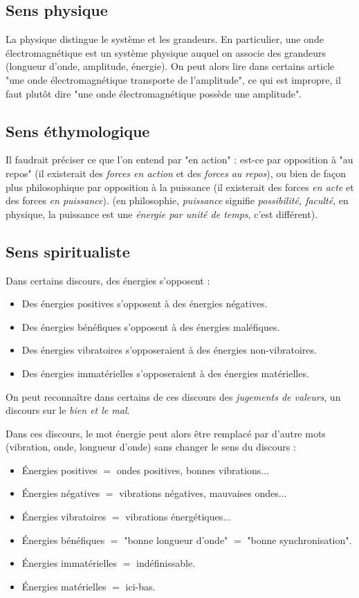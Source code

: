 \subsection{Sens physique}
La physique distingue le système et les grandeurs. En particulier, une onde électromagnétique est un système physique auquel on associe des grandeurs (longueur d'onde, amplitude, énergie). On peut alors lire dans certains article "une onde électromagnétique transporte de l'amplitude", ce qui est impropre, il faut plutôt dire "une onde électromagnétique possède une amplitude".

\subsection{Sens éthymologique}
Il faudrait préciser ce que l'on entend par "en action" : est-ce par opposition à "au repos" (il existerait des {\it forces en action} et des {\it forces au repos}), ou bien de façon plus philosophique par opposition à la puissance (il existerait des forces {\it en acte} et des forces {\it en puissance}). (en philosophie, {\it puissance} signifie {\it possibilité, faculté}, en physique, la puissance est une {\it énergie par unité de temps}, c'est différent).

\subsection{Sens spiritualiste}
Dans certains discours, des énergies s'opposent :
\begin{itemize}[leftmargin=1cm, label=, itemsep=1pt]
\item Des énergies positives s'opposent à des énergies négatives.
\item Des énergies bénéfiques s'opposent à des énergies maléfiques.
\item Des énergies vibratoires s'opposeraient à des énergies non-vibratoires.
\item Des énergies immatérielles s'opposeraient à des énergies matérielles.
\end{itemize}
On peut reconnaître dans certains de ces discours des {\it jugements de valeurs}, un discours sur le {\it bien et le mal}.

Dans ces discours, le mot énergie peut alors être remplacé par d'autre mots (vibration, onde, longueur d'onde) sans changer le sens du discours :
\begin{itemize}[leftmargin=1cm, label=, itemsep=1pt]
\item Énergies positives $=$ ondes positives, bonnes vibrations...
\item Énergies négatives $=$ vibrations négatives, mauvaises ondes...
\item Énergies vibratoires $=$ vibrations énergétiques...
\item Énergies bénéfiques $=$ "bonne longueur d'onde" $=$ "bonne synchronisation".
\item Énergies immatérielles $=$ indéfinissable.
\item Énergies matérielles $=$ ici-bas.
\end{itemize}

